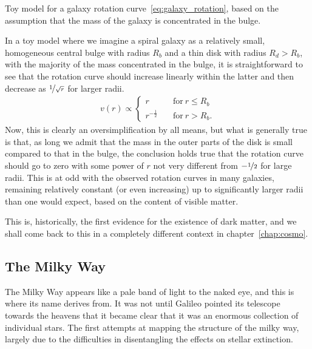\begin{marginfigure}
	
	\caption{Toy model for a galaxy rotation curve~\eqref{eq:galaxy_rotation}, based
		on the assumption that the mass of the galaxy is concentrated in the bulge.}
	\label{fig:galaxy_rotation}
\end{marginfigure}

In a toy model where we imagine a spiral galaxy as a relatively small, homogeneous
central bulge with radius $R_b$ and a thin disk with radius $R_d > R_b$, with the
majority of the mass concentrated in the bulge, it is straightforward to see that
the rotation curve should increase linearly within the latter and then decrease
as $\nicefrac{1}{\sqrt{r}}$ for larger radii.
\begin{align}\label{eq:galaxy_rotation}
  v(r) \propto \begin{cases}
    r & \quad\text{for}~r \leq R_b\\
    r^{-\frac{1}{2}} & \quad\text{for}~r > R_b.
  \end{cases}
\end{align}
Now, this is clearly an oversimplification by all means, but what is generally true
is that, as long we admit that the mass in the outer parts of the disk is small
compared to that in the bulge, the conclusion holds true that the rotation curve
should go to zero with some power of $r$ not very different from $-\nicefrac{1}{2}$
for large radii. This is at odd with the observed rotation curves in many galaxies,
remaining relatively constant (or even increasing) up to significantly larger radii
than one would expect, based on the content of visible matter.

This is, historically, the first evidence for the existence of dark matter, and
we shall come back to this in a completely different context in chapter~\ref{chap:cosmo}.


\subsection{The Milky Way}

The Milky Way appears like a pale band of light to the naked eye, and this is where
its name derives from. It was not until Galileo pointed its telescope towards the
heavens that it became clear that it was an enormous collection of individual
stars. The first attempts at mapping the structure of the milky way, largely due
to the difficulties in disentangling the effects on stellar extinction.

